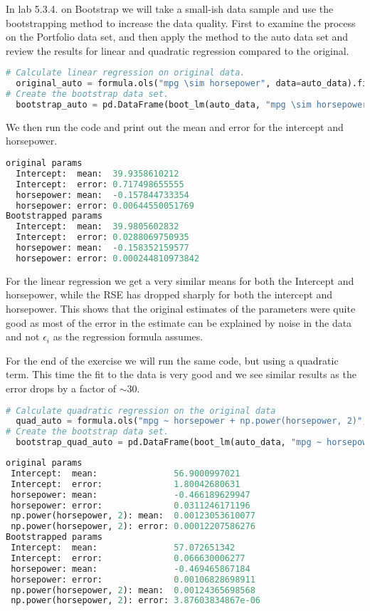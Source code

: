 In lab 5.3.4. on Bootstrap we will take a small-ish data sample and use the bootstrapping method to increase the data quality. First to examine the process on the Portfolio data set, and then apply the method to the auto data set and review the results for linear and quadratic regression compared to the original.

\begin{lstlisting}[language=Python]
# Calculate linear regression on original data.
  original_auto = formula.ols("mpg \sim horsepower", data=auto_data).fit() 
# Create the bootstrap data set.
  bootstrap_auto = pd.DataFrame(boot_lm(auto_data, "mpg \sim horsepower", 1000)) 
\end{lstlisting}
We then run the code and print out the mean and error for the intercept and horsepower.
\begin{lstlisting}[language=Python]
original params
  Intercept:  mean:  39.9358610212
  Intercept:  error: 0.717498655555
  horsepower: mean:  -0.157844733354
  horsepower: error: 0.00644550051769
Bootstrapped params
  Intercept:  mean:  39.9805602832
  Intercept:  error: 0.0288069750935
  horsepower: mean:  -0.158352159577
  horsepower: error: 0.000244810973842
\end{lstlisting}

For the linear regression we get a very similar means for both the Intercept and horsepower, while the RSE has dropped sharply for both the intercept and horsepower. This shows that the original estimates of the parameters were quite good as most of the error in the estimate can be explained by noise in the data and not $\epsilon_i$ as the regression formula assumes.

For the end of the exercise we will run the same code, but using a quadratic term. This time the fit to the data is very good and we see similar results as the error drops by a factor of $\sim30$.

\begin{lstlisting}[language=Python]
# Calculate quadratic regression on the original data
  quad_auto = formula.ols("mpg ~ horsepower + np.power(horsepower, 2)", data=auto_data).fit()
# Create the bootstrap data set.
  bootstrap_quad_auto = pd.DataFrame(boot_lm(auto_data, "mpg ~ horsepower + np.power(horsepower, 2)", 1000))
\end{lstlisting}
\begin{lstlisting}[language=Python]
original params
 Intercept:  mean:               56.9000997021
 Intercept:  error:              1.80042680631
 horsepower: mean:               -0.466189629947
 horsepower: error:              0.0311246171196
 np.power(horsepower, 2): mean:  0.00123053610077
 np.power(horsepower, 2): error: 0.00012207586276
Bootstrapped params
 Intercept:  mean:               57.072651342
 Intercept:  error:              0.066630006277
 horsepower: mean:               -0.469465867184
 horsepower: error:              0.00106828698911
 np.power(horsepower, 2): mean:  0.00124365698568
 np.power(horsepower, 2): error: 3.87603834867e-06
\end{lstlisting}



